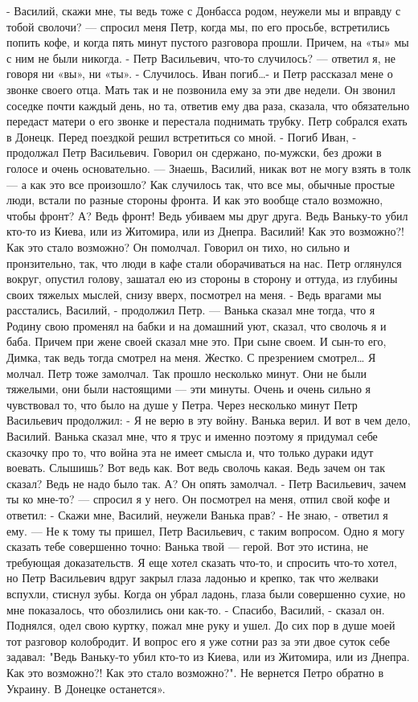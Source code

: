 - Василий, скажи мне, ты ведь тоже с Донбасса родом, неужели мы и вправду с тобой сволочи? --- спросил меня Петр, когда мы, по его просьбе, встретились попить кофе, и когда пять минут пустого разговора прошли. 
Причем, на «ты» мы с ним не были никогда.
- Петр Васильевич, что-то случилось? --- ответил я, не говоря ни «вы», ни «ты». 
- Случилось. Иван погиб…- и Петр рассказал мене о звонке своего отца. Мать так и не позвонила ему за эти две недели. Он звонил соседке почти каждый день, но та, ответив ему два раза, сказала, что обязательно передаст матери о его звонке и перестала поднимать трубку. Петр собрался ехать в Донецк. Перед поездкой решил встретиться со мной. 
- Погиб Иван, - продолжал Петр Васильевич. Говорил он сдержано, по-мужски, без дрожи в голосе и очень основательно. --- Знаешь, Василий, никак вот не могу взять в толк --- а как это все произошло? Как случилось так, что все мы, обычные простые люди, встали по разные стороны фронта. И как это вообще стало возможно, чтобы фронт? А? Ведь фронт! Ведь убиваем мы друг друга. Ведь Ваньку-то убил кто-то из Киева, или из Житомира, или из Днепра. Василий! Как это возможно?! Как это стало возможно?
Он помолчал. Говорил он тихо, но сильно и пронзительно, так, что люди в кафе стали оборачиваться на нас. Петр оглянулся вокруг, опустил голову, зашатал ею из стороны в сторону и оттуда, из глубины своих тяжелых мыслей, снизу вверх, посмотрел на меня.
- Ведь врагами мы расстались, Василий, - продолжил Петр. --- Ванька сказал мне тогда, что я Родину свою променял на бабки и на домашний уют, сказал, что сволочь я и баба. Причем при жене своей сказал мне это. При сыне своем. И сын-то его, Димка, так ведь тогда смотрел на меня. Жестко. С презрением смотрел…
Я молчал. Петр тоже замолчал. Так прошло несколько минут. Они не были тяжелыми, они были настоящими --- эти минуты. Очень и очень сильно я чувствовал то, что было на душе у Петра. 
Через несколько минут Петр Васильевич продолжил:
- Я не верю в эту войну. Ванька верил. И вот в чем дело, Василий. Ванька сказал мне, что я трус и именно поэтому я придумал себе сказочку про то, что война эта не имеет смысла и, что только дураки идут воевать. Слышишь? Вот ведь как. Вот ведь сволочь какая. Ведь зачем он так сказал? Ведь не надо было так. А?
Он опять замолчал. 
- Петр Васильевич, зачем ты ко мне-то? --- спросил я у него.
Он посмотрел на меня, отпил свой кофе и ответил:
- Скажи мне, Василий, неужели Ванька прав?
- Не знаю, - ответил я ему. --- Не к тому ты пришел, Петр Васильевич, с таким вопросом. Одно я могу сказать тебе совершенно точно: Ванька твой --- герой. Вот это истина, не требующая доказательств. 
Я еще хотел сказать что-то, и спросить что-то хотел, но Петр Васильевич вдруг закрыл глаза ладонью и крепко, так что желваки вспухли, стиснул зубы. 
Когда он убрал ладонь, глаза были совершенно сухие, но мне показалось, что обозлились они как-то. 
- Спасибо, Василий, - сказал он. Поднялся, одел свою куртку, пожал мне руку и ушел. 
До сих пор в душе моей тот разговор колобродит. И вопрос его я уже сотни раз за эти двое суток себе задавал: "Ведь Ваньку-то убил кто-то из Киева, или из Житомира, или из Днепра. Как это возможно?! Как это стало возможно?".
Не вернется Петро обратно в Украину. В Донецке останется».

